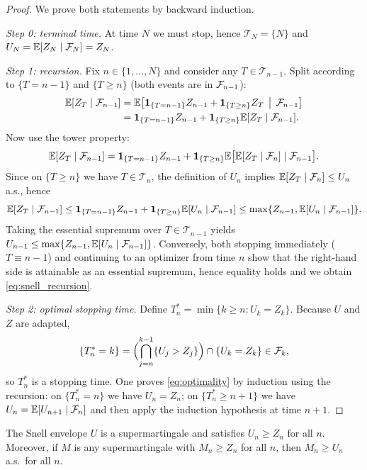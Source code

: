 \begin{proof}
We prove both statements by backward induction.

\smallskip
\noindent\emph{Step 0: terminal time.}
At time $N$ we must stop, hence $\mathcal{T}_N=\{N\}$ and $U_N=\mathbb{E}[Z_N\mid\mathcal{F}_N]=Z_N$.

\smallskip
\noindent\emph{Step 1: recursion.}
Fix $n\in\{1,\dots,N\}$ and consider any $T\in\mathcal{T}_{n-1}$.
Split according to $\{T=n-1\}$ and $\{T\ge n\}$ (both events are in $\mathcal{F}_{n-1}$):
\begin{align*}
\mathbb{E}[Z_T\mid \mathcal{F}_{n-1}]
&= \mathbb{E}\bigl[\mathbf{1}_{\{T=n-1\}}Z_{n-1} + \mathbf{1}_{\{T\ge n\}} Z_T \,\bigm|\,\mathcal{F}_{n-1}\bigr] \\
&= \mathbf{1}_{\{T=n-1\}} Z_{n-1} + \mathbf{1}_{\{T\ge n\}} \mathbb{E}[Z_T\mid \mathcal{F}_{n-1}].
\end{align*}
Now use the tower property:
\[
\mathbb{E}[Z_T\mid \mathcal{F}_{n-1}]
= \mathbf{1}_{\{T=n-1\}} Z_{n-1} + \mathbf{1}_{\{T\ge n\}}\mathbb{E}\bigl[\mathbb{E}[Z_T\mid \mathcal{F}_n]\mid \mathcal{F}_{n-1}\bigr].
\]
Since on $\{T\ge n\}$ we have $T\in\mathcal{T}_n$, the definition of $U_n$ implies
$\mathbb{E}[Z_T\mid \mathcal{F}_n]\le U_n$ a.s., hence
\[
\mathbb{E}[Z_T\mid \mathcal{F}_{n-1}] \le \mathbf{1}_{\{T=n-1\}}Z_{n-1} + \mathbf{1}_{\{T\ge n\}}\mathbb{E}[U_n\mid\mathcal{F}_{n-1}]
\le \max\{Z_{n-1},\mathbb{E}[U_n\mid\mathcal{F}_{n-1}]\}.
\]
Taking the essential supremum over $T\in\mathcal{T}_{n-1}$ yields
$U_{n-1}\le \max\{Z_{n-1},\mathbb{E}[U_n\mid\mathcal{F}_{n-1}]\}$.
Conversely, both stopping immediately ($T\equiv n-1$) and continuing to an optimizer from time $n$
show that the right-hand side is attainable as an essential supremum, hence equality holds and we obtain
\eqref{eq:snell_recursion}.

\smallskip
\noindent\emph{Step 2: optimal stopping time.}
Define $T_n^\ast=\min\{k\ge n: U_k=Z_k\}$. Because $U$ and $Z$ are adapted,
\[
\{T_n^\ast = k\}=\Bigl(\bigcap_{j=n}^{k-1}\{U_j>Z_j\}\Bigr)\cap\{U_k=Z_k\}\in \mathcal{F}_k,
\]
so $T_n^\ast$ is a stopping time. One proves \eqref{eq:optimality} by induction using the recursion:
on $\{T_n^\ast=n\}$ we have $U_n=Z_n$; on $\{T_n^\ast\ge n+1\}$ we have $U_n=\mathbb{E}[U_{n+1}\mid \mathcal{F}_n]$
and then apply the induction hypothesis at time $n+1$.
\end{proof}

\begin{proposition}\label{prop:smallest_supermartingale}
The Snell envelope $U$ is a supermartingale and satisfies $U_n\ge Z_n$ for all $n$.
Moreover, if $M$ is any supermartingale with $M_n\ge Z_n$ for all $n$, then $M_n\ge U_n$ a.s.\ for all $n$.
\end{proposition}

